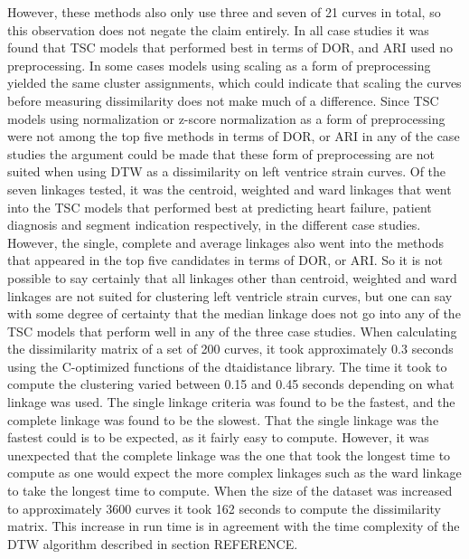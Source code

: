However, these methods also only use three and seven of 21 curves in total, so this observation does not negate the claim entirely. 
In all case studies it was found that TSC models that performed best in terms of DOR, and ARI used no preprocessing. 
In some cases models using scaling as a form of preprocessing yielded the same cluster assignments, which could indicate that scaling the curves before measuring dissimilarity does not make much of a difference.
Since TSC models using normalization or z-score normalization as a form of preprocessing were not among the top five methods in terms of DOR, or ARI in any of the case studies the argument could be made that these form of preprocessing are not suited when using DTW as a dissimilarity on left ventrice strain curves.
Of the seven linkages tested, it was the centroid, weighted and ward linkages that went into the TSC models that performed best at predicting heart failure, patient diagnosis and segment indication respectively, in the different case studies. 
However, the single, complete and average linkages also went into the methods that appeared in the top five candidates in terms of DOR, or ARI.
So it is not possible to say certainly that all linkages other than centroid, weighted and ward linkages are not suited for clustering left ventricle strain curves, but one can say with some degree of certainty that the median linkage does not go into any of the TSC models that perform well in any of the three case studies. 
When calculating the dissimilarity matrix of a set of 200 curves, it took approximately 0.3 seconds using the C-optimized functions of the dtaidistance library.
The time it took to compute the clustering varied between 0.15 and 0.45 seconds depending on what linkage was used. 
The single linkage criteria was found to be the fastest, and the complete linkage was found to be the slowest. 
That the single linkage was the fastest could is to be expected, as it fairly easy to compute. 
However, it was unexpected that the complete linkage was the one that took the longest time to compute as one would expect the more complex linkages such as the ward linkage to take the longest time to compute.
When the size of the dataset was increased to approximately 3600 curves it took 162 seconds to compute the dissimilarity matrix.
This increase in run time is in agreement with the time complexity of the DTW algorithm described in section REFERENCE.
